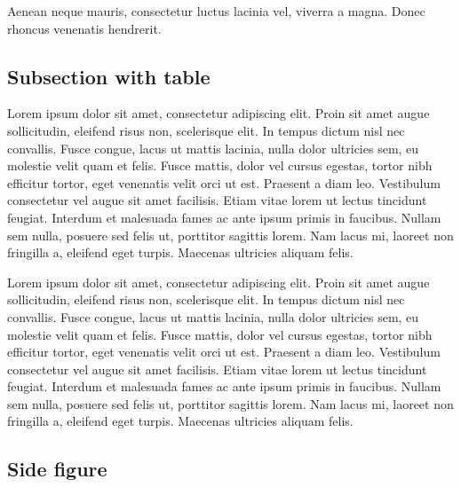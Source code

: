 \documentclass{article}
\begin{document}
Aenean neque mauris, consectetur luctus lacinia vel, viverra a magna. Donec rhoncus venenatis hendrerit.

\subsection{Subsection with table}
Lorem ipsum dolor sit amet, consectetur adipiscing elit. Proin sit amet augue sollicitudin, eleifend risus non, scelerisque elit. In tempus dictum nisl nec convallis. Fusce congue, lacus ut mattis lacinia, nulla dolor ultricies sem, eu molestie velit quam et felis. Fusce mattis, dolor vel cursus egestas, tortor nibh efficitur tortor, eget venenatis velit orci ut est. Praesent a diam leo. Vestibulum consectetur vel augue sit amet facilisis. Etiam vitae lorem ut lectus tincidunt feugiat. Interdum et malesuada fames ac ante ipsum primis in faucibus. Nullam sem nulla, posuere sed felis ut, porttitor sagittis lorem. Nam lacus mi, laoreet non fringilla a, eleifend eget turpis. Maecenas ultricies aliquam felis. 

Lorem ipsum dolor sit amet, consectetur adipiscing elit. Proin sit amet augue sollicitudin, eleifend risus non, scelerisque elit. In tempus dictum nisl nec convallis. Fusce congue, lacus ut mattis lacinia, nulla dolor ultricies sem, eu molestie velit quam et felis. Fusce mattis, dolor vel cursus egestas, tortor nibh efficitur tortor, eget venenatis velit orci ut est. Praesent a diam leo. Vestibulum consectetur vel augue sit amet facilisis. Etiam vitae lorem ut lectus tincidunt feugiat. Interdum et malesuada fames ac ante ipsum primis in faucibus. Nullam sem nulla, posuere sed felis ut, porttitor sagittis lorem. Nam lacus mi, laoreet non fringilla a, eleifend eget turpis. Maecenas ultricies aliquam felis. 

\subsection{Side figure}
\end{document}
